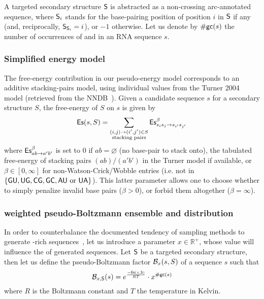 A targeted secondary structure $\text{\sf S}$ is abstracted as a non-crossing arc-annotated sequence,  where 
$\text{\sf S}_i$ stands for the base-pairing position of position $i$ in $\text{\sf S}$ if any (and, reciprocally, $\text{\sf S}_{\text{\sf S}_i}=i$), or $-1$ otherwise. 
Let us denote by ${\#\text{{\sf gc}}}(s)$ the number of occurrences of \Gb and \Cb in an RNA sequence $s$.

\subsubsection{Simplified energy model}
The free-energy contribution in our pseudo-energy model corresponds to an additive stacking-pairs model, using individual values from the Turner 2004 model (retrieved from the NNDB~\cite{Turner2010}). Given a candidate sequence $s$ for a secondary structure $S$, the free-energy of $S$ on $s$ is given by
\begin{align*}
  \text{{\sf Es}}(s,S) = \sum_{\substack{(i,j)\to (i',j')\in S\\ \text{stacking pairs}}}\text{{\sf Es}}^{\beta}_{s_is_j\to s_{i'}s_{j'}} 
\end{align*}
where $\text{{\sf Es}}^{\beta}_{ab\to a'b'}$ is set to $0$ if $ab=\varnothing$ (no base-pair to stack onto), the tabulated free-energy of stacking pairs $(ab)/(a'b')$ in the Turner model if available, or $\beta\in[0,\infty]$ for non-Watson-Crick/Wobble entries (i.e. not in $\{{\sf{G}}{\sf{U}},{\sf{U}}{\sf{G}},{\sf{C}}{\sf{G}},{\sf{G}}{\sf{C}}, {\sf{A}}{\sf{U}}\text{ or }{\sf{U}}{\sf{A}}\}$). This latter parameter allows one to choose whether to simply penalize invalid base pairs ($\beta>0$), or forbid them altogether ($\beta = \infty$).

\subsubsection{\GCContent weighted pseudo-Boltzmann ensemble and distribution}

In order to counterbalance the documented tendency of sampling methods to generate \Gb\Cb-rich sequences~\cite{Levin:2012kx}, let us introduce a parameter $x\in\mathbb{R}^+$, whose value will influence the \GCContent of generated sequences. Let $\text{\sf S}$ be a targeted secondary structure, then let us define the pseudo-Boltzmann factor $\mathcal{B}_{x}(s,S)$ of a sequence $s$ such that
\begin{equation}
\mathcal{B}_{x, \text{\sf S}}(s) = e^{\frac{-\text{{\sf Es}}(s,\text{\sf S})}{RT}}\cdot x^{{\#\text{{\sf gc}}}(s)}
\label{def:genBoltz}
\end{equation}
where $R$ is the Boltzmann constant and $T$ the temperature in Kelvin.

